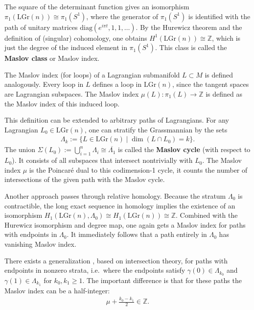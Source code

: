     \begin{property}
        The square of the determinant function gives an isomorphism $\pi_1(\mathrm{LGr}(n))\cong\pi_1(S^1)$, where the generator of $\pi_1(S^1)$ is identified with the path of unitary matrices $\mathrm{diag}(e^{i\pi t},1,1,\ldots)$. By the Hurewicz theorem and the definition of (singular) cohomology, one obtains $H^1(\mathrm{LGr}(n))\cong\mathbb{Z}$, which is just the degree of the induced element in $\pi_1(S^1)$. This class is called the \textbf{Maslov class} or Maslov index.

        The Maslov index (for loops) of a Lagrangian submanifold $L\subset M$ is defined analogously. Every loop in $L$ defines a loop in $\mathrm{LGr}(n)$, since the tangent spaces are Lagrangian subspaces. The Maslov index $\mu(L):\pi_1(L)\rightarrow\mathbb{Z}$ is defined as the Maslov index of this induced loop.

        This definition can be extended to arbitrary paths of Lagrangians. For any Lagrangian $L_0\in\mathrm{LGr}(n)$, one can stratify the Grassmannian by the sets
        \begin{gather}
            \Lambda_k := \{L\in\mathrm{LGr}(n)\mid\dim(L\cap L_0) = k\}.
        \end{gather}
        The union $\Sigma(L_0):=\bigcup_{i=1}^n\Lambda_i\cong\overline{\Lambda_1}$ is called the \textbf{Maslov cycle} (with respect to $L_0$). It consists of all subspaces that intersect nontrivially with $L_0$. The Maslov index $\mu$ is the Poincar\'e dual to this codimension-1 cycle, it counts the number of intersections of the given path with the Maslov cycle.

        Another approach passes through relative homology. Because the stratum $\Lambda_0$ is contractible, the long exact sequence in homology implies the existence of an isomorphism $H_1(\mathrm{LGr}(n),\Lambda_0)\cong H_1(\mathrm{LGr}(n))\cong\mathbb{Z}$. Combined with the Hurewicz isomorphism and degree map, one again gets a Maslov index for paths with endpoints in $\Lambda_0$. It immediately follows that a path entirely in $\Lambda_0$ has vanishing Maslov index.
    \end{property}
    \begin{remark}
        There exists a generalization \cite{path_maslov}, based on intersection theory, for paths with endpoints in nonzero strata, i.e.~where the endpoints satisfy $\gamma(0)\in\Lambda_{k_0}$ and $\gamma(1)\in\Lambda_{k_1}$ for $k_0,k_1\geq1$. The important difference is that for these paths the Maslov index can be a half-integer:
        \begin{gather}
            \mu + \frac{k_0-k_1}{2}\in\mathbb{Z}.
        \end{gather}
    \end{remark}


